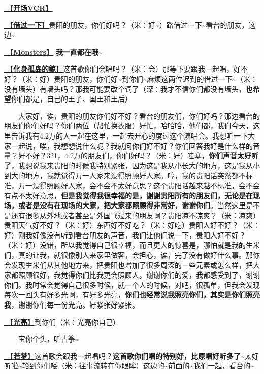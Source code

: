 \documentclass[]{ctexbook}
\begin{document}
\hyperref[opening-vcr]{🎥【\textbf{开场VCR}】}

\hyperref[I-will-go-my-way]{🎵【\textbf{借过一下}】}贵阳的朋友，你们好吗？（米：好\textasciitilde）路借过一下\textasciitilde 看台的朋友，这边\textasciitilde{}

\hyperref[Monsters]{🎵【\textbf{Monsters}】} \textbf{我一直都在哦\textasciitilde{}}

\hyperref[hua-shen-gu-dao-de-jing]{🎵【\textbf{化身孤岛的鲸}】}这首歌你们会唱吗？（米：会）那等下要跟我一起唱，好不好？（米：好）贵阳的朋友，你们好\textasciitilde 到你们\textasciitilde 麻烦这两位迟到的借过一下\textasciitilde（米：没有墙头）有墙头吗？那我可能要改个词了（深：我才不信你们都没有墙头，也希望你们都是，自己的王子、国王和王后）

  大家好，诶，贵阳的朋友你们好不好？看台的朋友们，你们好吗？那边看台的朋友们你们好吗？你们两位（帮忙换衣服）好忙，哈哈哈，他们都，我们今天，这里告诉我有4.2万的人一起在这里，一起去开心的度过这个演唱会。我想听一下大家一起说，唉，我想想说什么呢？我就问你们好不好？你们回答我好是什么样的音量？好不好？321，4.2万的朋友们，你们好吗？（米：好）哇塞，\textbf{你们声音太好听了}，我想说我来贵阳的时候我特别紧张，因为这是我从小长大的地方，这是我从小到大的地方，我就觉得万一人家来没得照顾好人家。哼，我的贵阳话突然都不标准，万一没得照顾好人家，会不会不太好意思？这个贵阳话越来越不标准，会不会有点不太好意思，\textbf{但是我觉得我很幸福的是，谢谢贵阳所有的朋友们，无论是在现场，或者是没有在现场的大家，把大家都照顾得非常好，谢谢你们}。当然这里是不是还有很多从外地或者甚至是外国飞过来的朋友啊？贵阳凉不凉爽？（米：凉爽）贵阳天气好不好？（米：好）东西好不好吃？（米：好吃）贵阳人好不好？（米：好）刚我好像没有听到看台朋友的声音，我们让他们说一下，贵阳人好不好？（米：好）没错，所以我觉得自己很幸福，而且更大的惊喜是，哪怕就是我的生米们，真的让我，就很像别人来家里做客，会担心，诶，完了没有做好什么事。那你会发现生米们从其他地方来，把贵阳也增加了很多周深的一些元素或怎么样，把大家都照顾很好，我觉得你们比我更会照顾人，谢谢你们的爱，我都感受到了，谢谢你们。我时常会觉得自己很多时候，就一个人的时候，对吧，很孤单，但我会发现每次一回头有好多光啊，有好多光亮，\textbf{你们也经常说我照亮你们，其实是你们照亮我}，谢谢你们每一份光亮。好紧张好紧张。

\hyperref[silver-linings]{🎵【\textbf{光亮}】}到你们（米：光亮你自己）

  宝你个头，听古筝\textasciitilde{}

\hyperref[ruomeng]{🎵【\textbf{若梦}】}这首歌会跟我一起唱吗？\textbf{这首歌你们唱的特别好，比原唱好听多了\textasciitilde{}}太好听啦\textasciitilde 轮到你们喽（米：往事流转在你眼眸）这边的\textasciitilde 前面的\textasciitilde 我们一起，看台的\textasciitilde{}
\end{document}

